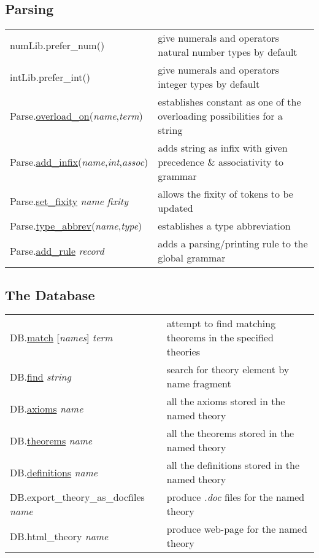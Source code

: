 \documentclass[landscape,10pt]{article}
\newcommand{\hol}[2]{{\sffamily #1.\href{#1.#2.html}{#2}}}
\newcommand{\holnoref}[2]{{\sffamily #1.#2}}
\newcommand{\var}[1]{{\emph{#1}}}
\begin{document}
\begin{multicols}{2}
\subsection*{Parsing}
\begin{tabular}{ll}
\holnoref{numLib}{prefer_num}() & give numerals and operators natural
number types by default \\
\holnoref{intLib}{prefer_int}() & give numerals and operators integer
types by default\\
\hol{Parse}{overload_on}(\var{name},\var{term}) & establishes constant as one of the overloading possibilities for a string \\
\hol{Parse}{add_infix}(\var{name},\var{int},\var{assoc}) & adds string as infix with given precedence \& associativity to grammar \\
\hol{Parse}{set_fixity} \var{name} \var{fixity} & allows the fixity of tokens to be updated \\
\hol{Parse}{type_abbrev}(\var{name},\var{type}) & establishes a type abbreviation \\
\hol{Parse}{add_rule} \var{record} & adds a parsing/printing rule to the global grammar \\
\end{tabular}
\subsection*{The Database}
\begin{tabular}{ll}
\hol{DB}{match} [\var{names}] \var{term} & attempt to find matching theorems in the specified theories \\
\hol{DB}{find} \var{string} & search for theory element by name fragment \\
\hol{DB}{axioms} \var{name} & all the axioms stored in the named theory \\
\hol{DB}{theorems} \var{name} & all the theorems stored in the named theory \\
\hol{DB}{definitions} \var{name} & all the definitions stored in the named theory \\
\holnoref{DB}{export_theory_as_docfiles} \var{name} & produce \emph{.doc} files for the named theory \\
\holnoref{DB}{html_theory} \var{name} & produce web-page for the named theory \\
\end{tabular}

\end{multicols}
\end{document}
